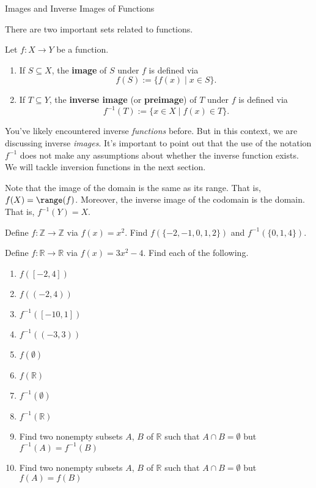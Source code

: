 \begin{section}{Images and Inverse Images of Functions}\label{sec:Images and Inverse Images}

There are two important sets related to functions.

\begin{definition}
Let $f:X\to Y$ be a function.  \begin{enumerate}[label=\textrm{(\alph*)}]
\item If $S\subseteq X$, the \textbf{image} of $S$ under $f$ is defined via
\[
f(S):=\{f(x) \mid  x\in S\}.
\]
\item  If $T\subseteq Y$, the \textbf{inverse image} (or \textbf{preimage}) of $T$ under $f$ is defined via
\[
f^{-1}(T):=\{x\in X \mid  f(x)\in T\}.
\]
\end{enumerate}
\end{definition}

You've likely encountered inverse \emph{functions} before. But in this context, we are discussing inverse \emph{images}. It's important to point out that the use of the notation $f^{-1}$ does not make any assumptions about whether the inverse function exists. We will tackle inversion functions in the next section.

Note that the image of the domain is the same as its range.  That is, $f(X)=\range(f)$. Moreover, the inverse image of the codomain is the domain.  That is, $f^{-1}(Y)=X$.

\begin{problem}
Define $f:\mathbb{Z}\to\mathbb{Z}$ via $f(x)=x^2$. Find $f(\{-2,-1,0,1,2\})$ and $f^{-1}(\{0,1,4\})$.
\end{problem}

\begin{problem}
Define $f:\mathbb{R}\to\mathbb{R}$ via $f(x)=3x^2-4$.
Find each of the following.
\begin{enumerate}[label=\textrm{(\alph*)}]
\item $f([-2,4])$
\item $f((-2,4))$
\item $f^{-1}([-10,1])$
\item $f^{-1}((-3,3))$
\item $f(\emptyset)$
\item $f(\mathbb{R})$
\item $f^{-1}(\emptyset)$
\item $f^{-1}(\mathbb{R})$
\item Find two nonempty subsets $A$, $B$ of $\mathbb{R}$ such that $A\cap B=\emptyset$ but $f^{-1}(A)=f^{-1}(B)$
\item Find two nonempty subsets $A$, $B$ of $\mathbb{R}$ such that $A\cap B=\emptyset$ but $f(A)=f(B)$
\end{enumerate}
\end{problem}


\end{section}
